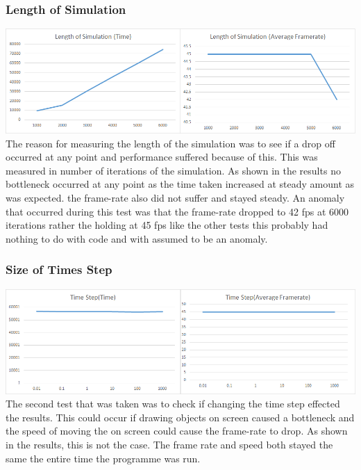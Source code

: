 \documentclass[12pt]{article}
\begin{document}
\subsubsection{Length of Simulation}
\includegraphics[scale=0.5]{pics/ialength.png}
\newline
The reason for measuring the length of the simulation was to see if a drop off occurred at any point and performance suffered because of this. This was measured in number of iterations of the simulation. As shown in the results no bottleneck occurred at any point as the time taken increased at steady amount as was expected.  the frame-rate also did not suffer and stayed steady. An anomaly that occurred during this test was that the frame-rate dropped to 42 fps at 6000 iterations rather the holding at 45 fps like the other tests this probably had nothing to do with code and with assumed to be an anomaly.
\subsubsection{Size of Times Step}
\includegraphics[scale=0.5]{pics/iatime.png}
\newline
The second test that was taken was to check if changing the time step effected the results. This could occur if drawing objects on screen caused a bottleneck and the speed of moving the on screen could cause the frame-rate to drop. As shown in the results, this is not the case. The frame rate and speed both stayed the same the entire time the programme was run.
\end{document}
